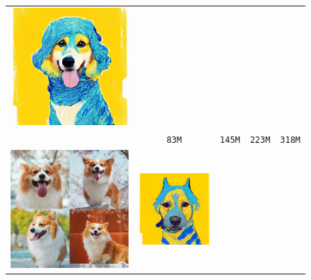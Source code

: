 \begin{figure}[!ht]
\begin{tabular}[t]{c c c c c}
    \includegraphics[width=\xwidth]{cp2/figures/dreambooth/dog/c192_checkpoint_99.png} \\
    &  \texttt{83M} &  \texttt{145M} &  \texttt{223M} &  \texttt{318M} \\
    \multirow[t]{3}{*}{
    \includegraphics[width=0.3\linewidth]{cp2/figures/dreambooth/dog/dog.pdf}
    } &
    \includegraphics[width=\xwidth]{cp2/figures/dreambooth/dog/c224_checkpoint_99.png} &

\end{tabular}
\end{figure}
